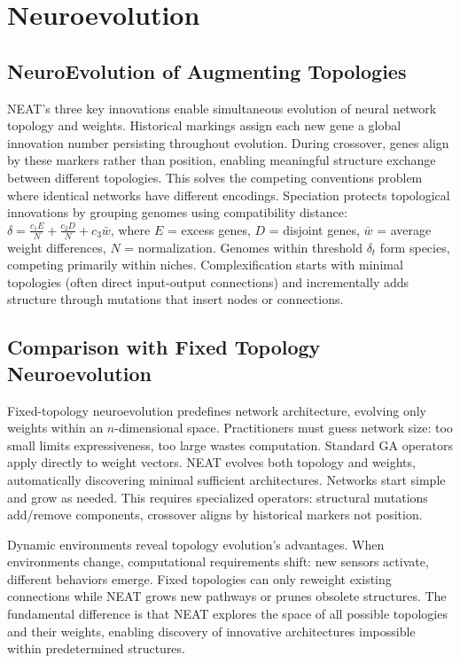 \documentclass[journal,12pt,onecolumn]{IEEEtran}
\begin{document}
\section{Neuroevolution}

\subsection{NeuroEvolution of Augmenting Topologies}

NEAT's three key innovations enable simultaneous evolution of neural network topology and weights. Historical markings assign each new gene a global innovation number persisting throughout evolution. During crossover, genes align by these markers rather than position, enabling meaningful structure exchange between different topologies. This solves the competing conventions problem where identical networks have different encodings. Speciation protects topological innovations by grouping genomes using compatibility distance: $\delta = \frac{c_1 E}{N} + \frac{c_2 D}{N} + c_3 \bar{w}$, where $E$ = excess genes, $D$ = disjoint genes, $\bar{w}$ = average weight differences, $N$ = normalization. Genomes within threshold $\delta_t$ form species, competing primarily within niches. Complexification starts with minimal topologies (often direct input-output connections) and incrementally adds structure through mutations that insert nodes or connections.

\subsection{Comparison with Fixed Topology Neuroevolution}

Fixed-topology neuroevolution predefines network architecture, evolving only weights within an $n$-dimensional space. Practitioners must guess network size: too small limits expressiveness, too large wastes computation. Standard GA operators apply directly to weight vectors. NEAT evolves both topology and weights, automatically discovering minimal sufficient architectures. Networks start simple and grow as needed. This requires specialized operators: structural mutations add/remove components, crossover aligns by historical markers not position.

Dynamic environments reveal topology evolution's advantages. When environments change, computational requirements shift: new sensors activate, different behaviors emerge. Fixed topologies can only reweight existing connections while NEAT grows new pathways or prunes obsolete structures. The fundamental difference is that NEAT explores the space of all possible topologies and their weights, enabling discovery of innovative architectures impossible within predetermined structures.
\end{document}

